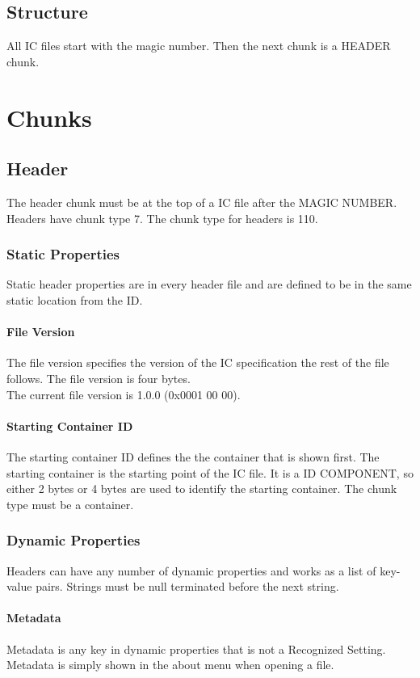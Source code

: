 \documentclass{report}
\begin{document}
\section{Structure}
All IC files start with the magic number. Then the next chunk is a HEADER chunk.
\chapter{Chunks}

\section{Header}
The header chunk must be at the top of a IC file after the MAGIC NUMBER. 
Headers have chunk type 7.
The chunk type for headers is 110. 

\subsection{Static Properties}
Static header properties are in every header file and are defined to be in the same static location from the ID. 

\subsubsection{File Version}
The file version specifies the version of the IC specification the rest of the file follows. The file version is four bytes.\\
The current file version is 1.0.0 (0x0001 00 00).

\subsubsection{Starting Container ID}
The starting container ID defines the the container that is shown first. The starting container is the starting point of the IC file. It is a ID COMPONENT, so either 2 bytes or 4 bytes are used to identify the starting container. The chunk type must be a container.

\subsection{Dynamic Properties}
Headers can have any number of dynamic properties and works as a list of key-value pairs. Strings must be null terminated before the next string.
\subsubsection{Metadata}
Metadata is any key in dynamic properties that is not a Recognized Setting. Metadata is simply shown in the about menu when opening a file.
\end{document}

